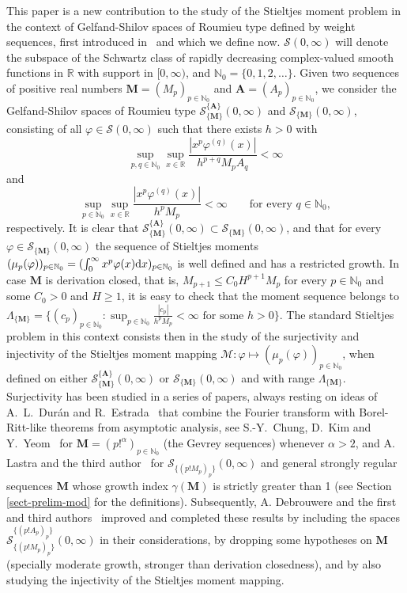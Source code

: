 \documentclass[12pt,a4paper]{article}
\newcommand{\N}{\mathbb{N}}
\newcommand{\R}{\mathbb{R}}
\newcommand{\M}{{\boldsymbol{M}}}
\newcommand{\A}{{\boldsymbol{A}}}
\newcommand{\dx}{{\rm d}x }
\theoremstyle{plain}
\theoremstyle{definition}
\numberwithin{equation}{section}
\begin{document}
This paper is a new contribution to the study of the Stieltjes moment problem in the context of Gelfand-Shilov spaces of Roumieu type defined by weight sequences, first introduced in~\cite{G-S} and which we define now.
$\mathcal{S}(0,\infty)$ will denote the subspace of the Schwartz class of rapidly decreasing complex-valued smooth functions in $\R$ with support in $[0,\infty)$, and $\N_0=\{0,1,2,\dots\}$. Given two sequences of positive real numbers $\M=(M_p)_{p\in\N_0}$ and $\A=(A_p)_{p\in\N_0}$, we consider the Gelfand-Shilov spaces of Roumieu type
$\mathcal{S}_{\{\M\}}^{\{\A\}}(0,\infty)$ and $\mathcal{S}_{\{\M\}}(0,\infty)$,
consisting of all $\varphi \in \mathcal{S}(0,\infty)$  such that there exists $h>0$ with
$$
\sup_{p,q \in \N_0} \sup_{x \in \R} \frac{|x^p\varphi^{(q)}(x)|}{h^{p+q}M_pA_q} < \infty
$$
and
$$
\sup_{p\in \N_0} \sup_{x \in \R} \frac{|x^p\varphi^{(q)}(x)|}{h^{p}M_p} < \infty \qquad \text{for every }q \in \N_0,
$$
respectively. It is clear that $\mathcal{S}_{\{\M\}}^{\{\A\}}(0,\infty)\subset \mathcal{S}_{\{\M\}}(0,\infty)$, and that for every $\varphi \in \mathcal{S}_{\{\M\}}(0,\infty)$ the sequence of Stieltjes moments $(\mu_p(\varphi))_{p\in\N_0} = (\int_0^\infty x^p \varphi(x) \dx)_{p \in \N_0}$ is well defined and has a restricted growth.
In case $\M$ is derivation closed, that is, $M_{p+1} \leq C_0H^{p+1}M_p$ for every  $p \in \N_0$ and some $C_0>0$ and $H \geq 1$, it is easy to check that the moment sequence belongs to
$
\Lambda_{\{\M\}} = \{ (c_p)_{p \in \N_0}\colon \sup_{p \in \N_0} \frac{|c_p|}{h^p M_p} < \infty \text{ for some }h>0 \}.
$
The standard Stieltjes problem in this context consists then in the study of the surjectivity and injectivity of the Stieltjes moment mapping $\mathcal{M}\colon\varphi\mapsto (\mu_p(\varphi))_{p\in\N_0}$, when defined on either $\mathcal{S}_{\{\M\}}^{\{\A\}}(0,\infty)$ or $\mathcal{S}_{\{\M\}}(0,\infty)$ and with range $\Lambda_{\{\M\}}$.
Surjectivity has been studied in a series of papers, always resting on ideas of A.~L.~Dur\'an and R.~Estrada~\cite{D-E} that combine the Fourier transform with Borel-Ritt-like theorems from asymptotic analysis, see S.-Y.~Chung, D.~Kim and Y.~Yeom~\cite[Thm.\ 3.1]{ChungKimYeom} for $\M=(p!^{\alpha})_{p\in\N_0}$ (the Gevrey sequences) whenever $\alpha>2$, and A. Lastra and the third author~\cite{L-S08,L-S09} for $\mathcal{S}_{\{(p!M_p)_p\}}(0,\infty)$ and general strongly regular sequences $\M$ whose growth index $\gamma(\M)$ is strictly greater than 1 (see Section \ref{sect-prelim-mod} for the definitions).
Subsequently, A. Debrouwere and the first and third  authors~\cite{DebrouwereetalMoment} improved and completed these results by including the spaces $\mathcal{S}_{\{(p!M_p)_p\}}^{\{(p!A_p)_p\}}(0,\infty)$ in their considerations, by dropping some hypotheses on $\M$ (specially moderate growth, stronger than derivation closedness), and by also studying the injectivity of the Stieltjes moment mapping.
\end{document}
